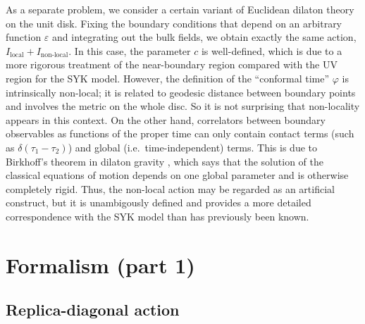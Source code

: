 \documentclass[12pt]{article}
\newcommand{\loc}{\text{local}}
\newcommand{\nloc}{\text{non-local}}
\newcommand{\vep}{\varepsilon}
\newcommand{\vp}{\varphi}
\def\ie{i.e.\ }
\begin{document}
As a separate problem, we consider a certain variant of Euclidean dilaton theory on the unit disk. Fixing the boundary conditions that depend on an arbitrary function $\vep$ and integrating out the bulk fields, we obtain exactly the same action, $I_{\loc}+I_{\nloc}$. In this case, the parameter $c$ is well-defined, which is due to a more rigorous treatment of the near-boundary region compared with the UV region for the SYK model. However, the definition of the ``conformal time'' $\vp$ is intrinsically non-local; it is related to geodesic distance between boundary points and involves the metric on the whole disc. So it is not surprising that non-locality appears in this context. On the other hand, correlators between boundary observables as functions of the proper time can only contain contact terms (such as $\delta(\tau_1-\tau_2)$) and global (\ie time-independent) terms. This is due to Birkhoff's theorem in dilaton gravity \cite{L-MKu94}, which says that the solution of the classical equations of motion depends on one global parameter and is otherwise completely rigid. Thus, the non-local action may be regarded as an artificial construct, but it is unambigously defined and provides a more detailed correspondence with the SYK model than has previously been known.

\section{Formalism (part 1)}

\subsection{Replica-diagonal action}

\end{document}
